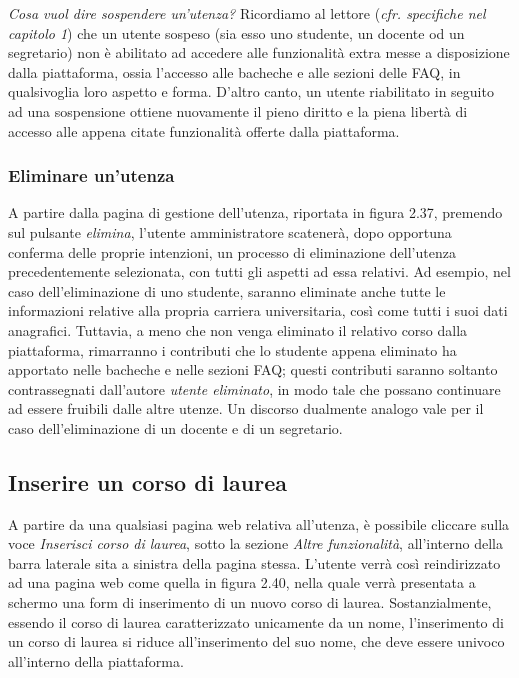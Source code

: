 \documentclass [a4paper,11pt]{book}
\begin{document}
\emph{Cosa vuol dire sospendere un'utenza?} Ricordiamo al lettore (\emph{cfr. specifiche nel capitolo 1}) che un utente sospeso (sia esso uno studente, un docente od un segretario) non è abilitato ad accedere alle funzionalità extra messe a disposizione dalla piattaforma, ossia l'accesso alle bacheche e alle sezioni delle FAQ, in qualsivoglia loro aspetto e forma. D'altro canto, un utente riabilitato in seguito ad una sospensione ottiene nuovamente il pieno diritto e la piena libertà di accesso alle appena citate funzionalità offerte dalla piattaforma.

\medskip

\subsubsection{Eliminare un'utenza}

A partire dalla pagina di gestione dell'utenza, riportata in figura 2.37, premendo sul pulsante \emph{elimina}, l'utente amministratore scatenerà, dopo opportuna conferma delle proprie intenzioni, un processo di eliminazione dell'utenza precedentemente selezionata, con tutti gli aspetti ad essa relativi. Ad esempio, nel caso dell'eliminazione di uno studente, saranno eliminate anche tutte le informazioni relative alla propria carriera universitaria, così come tutti i suoi dati anagrafici. Tuttavia, a meno che non venga eliminato il relativo corso dalla piattaforma, rimarranno i contributi che lo studente appena eliminato ha apportato nelle bacheche e nelle sezioni FAQ; questi contributi saranno soltanto contrassegnati dall'autore \emph{utente eliminato}, in modo tale che possano continuare ad essere fruibili dalle altre utenze. Un discorso dualmente analogo vale per il caso dell'eliminazione di un docente e di un segretario.

\medskip

\subsection{Inserire un corso di laurea}

A partire da una qualsiasi pagina web relativa all'utenza, è possibile cliccare sulla voce \emph{Inserisci corso di laurea}, sotto la sezione \emph{Altre funzionalità}, all'interno della barra laterale sita a sinistra della pagina stessa. L'utente verrà così reindirizzato ad una pagina web come quella in figura 2.40, nella quale verrà presentata a schermo una form di inserimento di un nuovo corso di laurea. Sostanzialmente, essendo il corso di laurea caratterizzato unicamente da un nome, l'inserimento di un corso di laurea si riduce all'inserimento del suo nome, che deve essere univoco all'interno della piattaforma.
\end{document}

